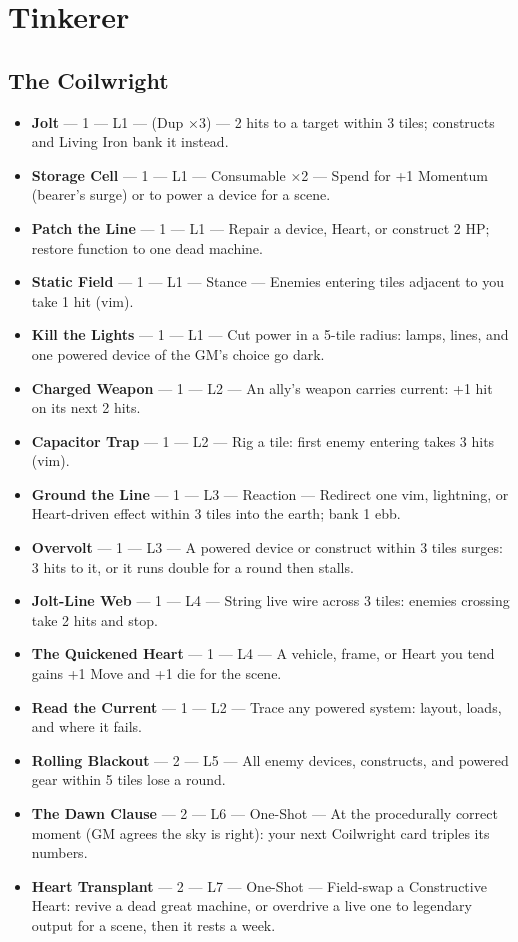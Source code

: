 \section{Tinkerer}

\subsection{The Coilwright}
\begin{itemize}
    \item \textbf{Jolt} --- 1 --- L1 --- (Dup ×3) --- 2 hits to a target within 3 tiles; constructs and Living Iron bank it instead.
    \item \textbf{Storage Cell} --- 1 --- L1 --- Consumable ×2 --- Spend for +1 Momentum (bearer's surge) or to power a device for a scene.
    \item \textbf{Patch the Line} --- 1 --- L1 --- Repair a device, Heart, or construct 2 HP; restore function to one dead machine.
    \item \textbf{Static Field} --- 1 --- L1 --- Stance --- Enemies entering tiles adjacent to you take 1 hit (vim).
    \item \textbf{Kill the Lights} --- 1 --- L1 --- Cut power in a 5-tile radius: lamps, lines, and one powered device of the GM's choice go dark.
    \item \textbf{Charged Weapon} --- 1 --- L2 --- An ally's weapon carries current: +1 hit on its next 2 hits.
    \item \textbf{Capacitor Trap} --- 1 --- L2 --- Rig a tile: first enemy entering takes 3 hits (vim).
    \item \textbf{Ground the Line} --- 1 --- L3 --- Reaction --- Redirect one vim, lightning, or Heart-driven effect within 3 tiles into the earth; bank 1 ebb.
    \item \textbf{Overvolt} --- 1 --- L3 --- A powered device or construct within 3 tiles surges: 3 hits to it, or it runs double for a round then stalls.
    \item \textbf{Jolt-Line Web} --- 1 --- L4 --- String live wire across 3 tiles: enemies crossing take 2 hits and stop.
    \item \textbf{The Quickened Heart} --- 1 --- L4 --- A vehicle, frame, or Heart you tend gains +1 Move and +1 die for the scene.
    \item \textbf{Read the Current} --- 1 --- L2 --- Trace any powered system: layout, loads, and where it fails.
    \item \textbf{Rolling Blackout} --- 2 --- L5 --- All enemy devices, constructs, and powered gear within 5 tiles lose a round.
    \item \textbf{The Dawn Clause} --- 2 --- L6 --- One-Shot --- At the procedurally correct moment (GM agrees the sky is right): your next Coilwright card triples its numbers.
    \item \textbf{Heart Transplant} --- 2 --- L7 --- One-Shot --- Field-swap a Constructive Heart: revive a dead great machine, or overdrive a live one to legendary output for a scene, then it rests a week.
\end{itemize}

